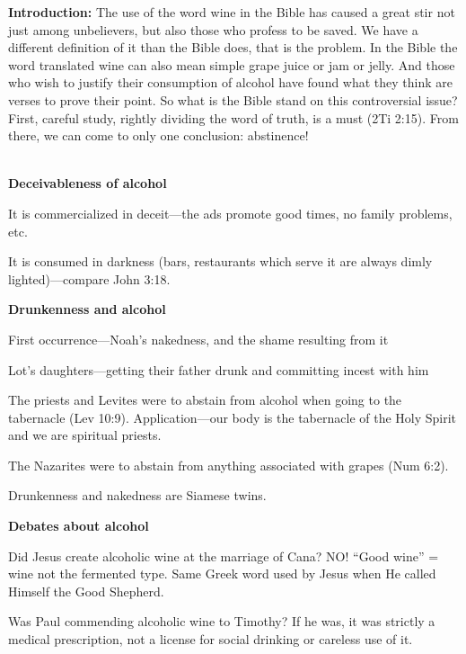 \textbf{Introduction: }The use of the word wine in the Bible has caused a great stir not just among unbelievers, but also those who profess to be saved.  We have a different definition of it than the Bible does, that is the problem.  In the Bible the word translated wine can also mean simple grape juice or jam or jelly.  And those who wish to justify their consumption of alcohol have found what they think are verses to prove their point.  So what is the Bible stand on this controversial issue?  First, careful study, rightly dividing the word of truth, is a must (2Ti 2:15).  From there, we can come to only one conclusion:  abstinence! \\
\\
\begin{compactenum}[I.]
    \item \textbf{Deceivableness of alcohol} 
    \begin{compactenum}[A.]
    	\item It is commercialized in deceit—the ads promote good times, no family problems, etc.
    	\item It is consumed in darkness (bars, restaurants which serve it are always dimly lighted)—compare John 3:18.
    \end{compactenum}
    \item \textbf{Drunkenness and alcohol} 
    \begin{compactenum}[A.]
    	\item First occurrence—Noah’s nakedness, and the shame resulting from it
    	\item Lot’s daughters—getting their father drunk and committing incest with him
    	\item  The priests and Levites were to abstain from alcohol when going to the tabernacle (Lev 10:9).  Application—our body is the tabernacle of the Holy Spirit and we are spiritual priests.
    	\item The Nazarites were to abstain from anything associated with grapes (Num 6:2).
    	\item Drunkenness and nakedness are Siamese twins.
    \end{compactenum}
    \item \textbf{Debates about alcohol} 
    \begin{compactenum}[A.]
    	\item Did Jesus create alcoholic wine at the marriage of Cana?  NO!  “Good wine” = wine not the fermented type.  Same Greek word used by Jesus when He called Himself the Good Shepherd.
    	\item Was Paul commending alcoholic wine to Timothy?  If he was, it was strictly a medical prescription, not a license for social drinking or careless use of it.

\end{compactenum}
\end{compactenum}
